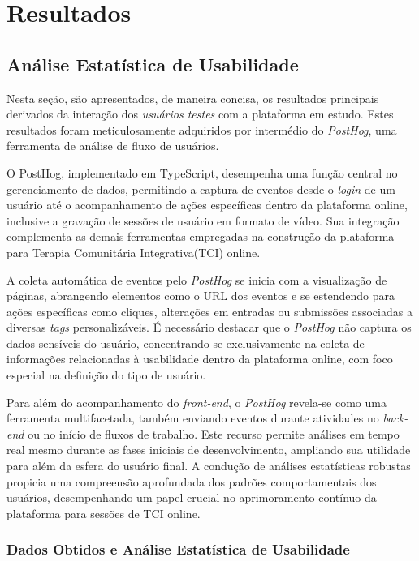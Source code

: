 \part{Resultados}
\chapter[Resultados]{Análise Estatística de Usabilidade}
Nesta seção, são apresentados, de maneira concisa, os resultados principais derivados da interação dos \textit{usuários testes} com a plataforma em estudo. Estes resultados foram meticulosamente adquiridos por intermédio do \textit{PostHog}, uma ferramenta de análise de fluxo de usuários.

O PostHog, implementado em TypeScript, desempenha uma função central no gerenciamento de dados, permitindo a captura de eventos desde o \textit{login} de um usuário até o acompanhamento de ações específicas dentro da plataforma online, inclusive a gravação de sessões de usuário em formato de vídeo. Sua integração complementa as demais ferramentas empregadas na construção da plataforma para Terapia Comunitária Integrativa(TCI) online.

A coleta automática de eventos pelo \textit{PostHog} se inicia com a visualização de páginas, abrangendo elementos como o URL dos eventos e se estendendo para ações específicas como cliques, alterações em entradas ou submissões associadas a diversas \textit{tags} personalizáveis. É necessário destacar que o \textit{PostHog} não captura os dados sensíveis do usuário, concentrando-se exclusivamente na coleta de informações relacionadas à usabilidade dentro da plataforma online, com foco especial na definição do tipo de usuário.

Para além do acompanhamento do \textit{front-end}, o \textit{PostHog} revela-se como uma ferramenta multifacetada, também enviando eventos durante atividades no \textit{back-end} ou no início de fluxos de trabalho. Este recurso permite análises em tempo real mesmo durante as fases iniciais de desenvolvimento, ampliando sua utilidade para além da esfera do usuário final. A condução de análises estatísticas robustas propicia uma compreensão aprofundada dos padrões comportamentais dos usuários, desempenhando um papel crucial no aprimoramento contínuo da plataforma para sessões de TCI online.

\section{Dados Obtidos e Análise Estatística de Usabilidade}

